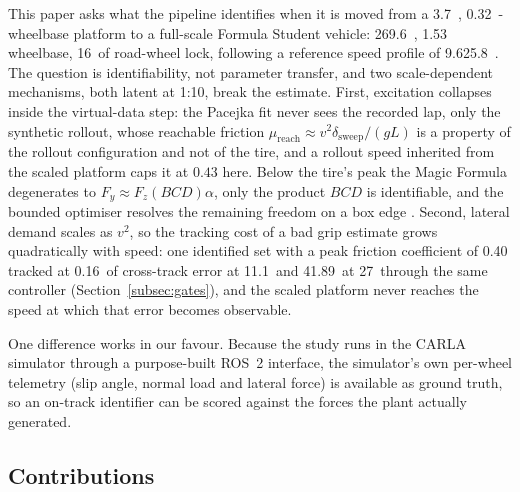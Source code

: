 \documentclass[lineno,12pt]{sn-jnl}
\makeatletter
\newif\ifsiu@prev
\DeclareRobustCommand{\siu@sep}{\ifsiu@prev\,\fi}
\DeclareRobustCommand{\siu@unit}[1]{\siu@sep\text{#1}\siu@prevtrue}
\DeclareRobustCommand{\siu@pre}[1]{\siu@sep\text{#1}\siu@prevfalse}
\DeclareRobustCommand{\siu@div}[1]{\text{#1}\siu@prevfalse}
\DeclareRobustCommand{\meter}{m}
\DeclareRobustCommand{\second}{s}
\DeclareRobustCommand{\gram}{g}
\DeclareRobustCommand{\newton}{N}
\DeclareRobustCommand{\radian}{rad}
\DeclareRobustCommand{\hertz}{Hz}
\DeclareRobustCommand{\percent}{\%}
\DeclareRobustCommand{\g}{\textit{g}}
\DeclareRobustCommand{\kilo}{k}
\DeclareRobustCommand{\milli}{m}
\DeclareRobustCommand{\per}{/}
\DeclareRobustCommand{\squared}{\ensuremath{^{2}}}
\providecommand{\degree}{\ensuremath{^{\circ}}}
\DeclareRobustCommand{\si}[1]{\begingroup
  \siu@prevfalse
  \renewcommand{\meter}{\siu@unit{m}}%
  \renewcommand{\second}{\siu@unit{s}}%
  \renewcommand{\gram}{\siu@unit{g}}%
  \renewcommand{\newton}{\siu@unit{N}}%
  \renewcommand{\radian}{\siu@unit{rad}}%
  \renewcommand{\hertz}{\siu@unit{Hz}}%
  \renewcommand{\percent}{\siu@unit{\%}}%
  \renewcommand{\degree}{\siu@unit{\ensuremath{^{\circ}}}}%
  \renewcommand{\g}{\siu@unit{\textit{g}}}%
  \renewcommand{\kilo}{\siu@pre{k}}%
  \renewcommand{\milli}{\siu@pre{m}}%
  \renewcommand{\per}{\siu@div{/}}%
  \renewcommand{\squared}{\ensuremath{^{2}}}%
  #1\endgroup}
\DeclareRobustCommand{\num}[1]{#1}
\DeclareRobustCommand{\SI}[2]{#1\,\si{#2}}
\DeclareRobustCommand{\SIrange}[3]{#1\text{--}#2\,\si{#3}}
\theoremstyle{thmstyleone}%
\theoremstyle{thmstyletwo}%
\theoremstyle{thmstylethree}%
\makeatother
\begin{document}
This paper asks what the pipeline identifies when it is moved from a
\SI{3.7}{\kilo\gram}, \SI{0.32}{\meter}-wheelbase platform to a full-scale
Formula Student vehicle: \SI{269.6}{\kilo\gram}, \SI{1.53}{\meter} wheelbase,
\SI{16}{\degree} of road-wheel lock, following a reference speed profile of
\SIrange{9.6}{25.8}{\meter\per\second}. The question is identifiability, not
parameter transfer, and two scale-dependent mechanisms, both latent at 1:10,
break the estimate. First, excitation collapses inside the virtual-data
step: the Pacejka fit never sees the recorded lap, only the synthetic rollout,
whose reachable friction
$\mu_{\mathrm{reach}}\!\approx\!v^{2}\delta_{\mathrm{sweep}}/(gL)$ is a property
of the rollout configuration and not of the tire, and a rollout speed inherited
from the scaled platform caps it at $0.43$ here. Below the tire's peak the Magic
Formula degenerates to $F_{y}\approx F_{z}(BCD)\alpha$, only the product $BCD$
is identifiable, and the bounded optimiser resolves the remaining freedom on a
box edge \cite{ljung1999sysid,pacejka2012book}. Second, lateral demand
scales as $v^{2}$, so the tracking cost of a bad grip estimate grows
quadratically with speed:
one identified set with a peak friction coefficient of \num{0.40} tracked at
\SI{0.16}{\meter} of cross-track error at \SI{11.1}{\meter\per\second} and
\SI{41.89}{\meter} at \SI{27}{\meter\per\second} through the same controller
(Section~\ref{subsec:gates}), and the scaled platform never reaches the speed at
which that error becomes observable.

One difference works in our favour. Because the study runs in the CARLA
simulator \cite{carla2017} through a purpose-built ROS~2 interface, the
simulator's own per-wheel telemetry (slip angle, normal load and lateral force)
is available as ground truth, so an on-track identifier can be scored against
the forces the plant actually generated.

\subsection{Contributions}
\end{document}
